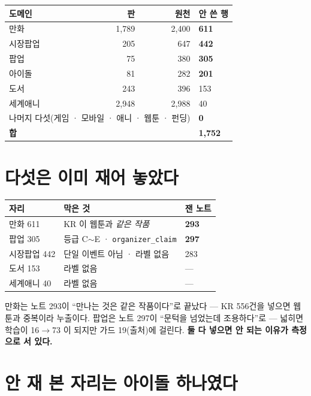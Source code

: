 \documentclass[10pt]{article}
\begin{document}
\begin{center}\footnotesize
\begin{tabular}{lrrl}
\hline
도메인 & 판 & 원천 & 안 쓴 행 \\
\hline
만화 & 1,789 & 2,400 & \textbf{611} \\
시장팝업 & 205 & 647 & \textbf{442} \\
팝업 & 75 & 380 & \textbf{305} \\
아이돌 & 81 & 282 & \textbf{201} \\
도서 & 243 & 396 & 153 \\
세계애니 & 2,948 & 2,988 & 40 \\
\hline
\multicolumn{3}{l}{나머지 다섯(게임 · 모바일 · 애니 · 웹툰 · 펀딩)} & \textbf{0} \\
\hline
\textbf{합} & & & \textbf{1,752} \\
\hline
\end{tabular}
\end{center}

\section{다섯은 이미 재어 놓았다}

\begin{center}\footnotesize
\begin{tabular}{lll}
\hline
자리 & 막은 것 & 잰 노트 \\
\hline
만화 611 & KR 이 웹툰과 \emph{같은 작품} & \textbf{293} \\
팝업 305 & 등급 C$\sim$E · \texttt{organizer\_claim} & \textbf{297} \\
시장팝업 442 & 단일 이벤트 아님 · 라벨 없음 & 283 \\
도서 153 & 라벨 없음 & --- \\
세계애니 40 & 라벨 없음 & --- \\
\hline
\end{tabular}
\end{center}

만화는 노트 293이 ``만나는 것은 같은 작품이다''로 끝났다 --- KR 556건을
넣으면 웹툰과 중복이라 누출이다. 팝업은 노트 297이 ``문턱을 넘었는데
조용하다''로 --- 넓히면 학습이 16$\to$73 이 되지만 가드 19(출처)에 걸린다.
\textbf{둘 다 넣으면 안 되는 이유가 측정으로 서 있다.}

\section{안 재 본 자리는 아이돌 하나였다}
\end{document}
